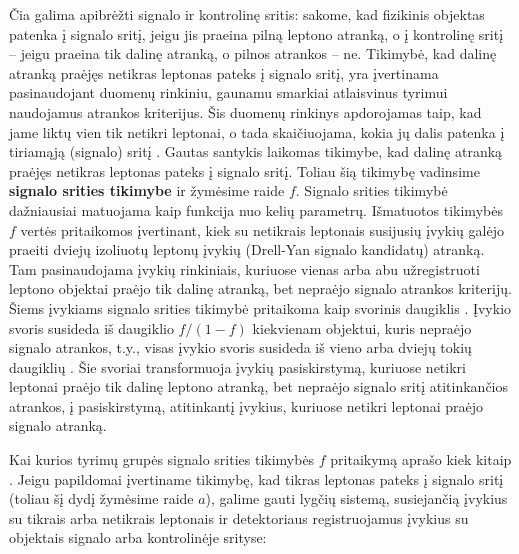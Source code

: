 \documentclass[a4paper, 12pt, oneside]{article}
\begin{document}
Čia galima apibrėžti signalo ir kontrolinę sritis: sakome, kad fizikinis objektas patenka į signalo sritį, jeigu jis
praeina pilną leptono atranką, o į kontrolinę sritį -- jeigu praeina tik dalinę atranką, o pilnos atrankos -- ne.
Tikimybė, kad dalinę atranką praėjęs netikras leptonas pateks į signalo sritį, yra įvertinama pasinaudojant duomenų
rinkiniu, gaunamu smarkiai atlaisvinus tyrimui naudojamus atrankos kriterijus.
Šis duomenų rinkinys apdorojamas taip, kad jame liktų vien tik netikri leptonai, o tada skaičiuojama, kokia jų
dalis patenka į tiriamąją (signalo) sritį \cite{DY_ATLAS2016, Z'_ATLAS2011, Z'_CMS2011, Z'_ATLAS2014, Z'_CMS2015}.
Gautas santykis laikomas tikimybe, kad dalinę atranką praėjęs netikras leptonas pateks į signalo sritį.
Toliau šią tikimybę vadinsime \textbf{signalo srities tikimybe} ir žymėsime raide $f$.
Signalo srities tikimybė dažniausiai matuojama kaip funkcija nuo kelių parametrų.
Išmatuotos tikimybės $f$ vertės pritaikomos įvertinant, kiek su netikrais leptonais susijusių įvykių galėjo praeiti dviejų
izoliuotų leptonų įvykių (Drell-Yan signalo kandidatų) atranką.
Tam pasinaudojama įvykių rinkiniais, kuriuose vienas arba abu užregistruoti leptono objektai praėjo tik dalinę atranką, bet
nepraėjo signalo atrankos kriterijų.
Šiems įvykiams signalo srities tikimybė pritaikoma kaip svorinis daugiklis \cite{Z'_ATLAS2011, Z'_CMS2011, Z'_CMS2015}.
Įvykio svoris susideda iš daugiklio $f/(1-f)$ kiekvienam objektui, kuris nepraėjo signalo atrankos, t.y., visas įvykio svoris
susideda iš vieno arba dviejų tokių daugiklių \cite{Z'_CMS2015}.
Šie svoriai transformuoja įvykių pasiskirstymą, kuriuose netikri leptonai praėjo tik dalinę leptono atranką,
bet nepraėjo signalo sritį atitinkančios atrankos, į pasiskirstymą, atitinkantį įvykius, kuriuose netikri leptonai
praėjo signalo atranką.

Kai kurios tyrimų grupės signalo srities tikimybės $f$ pritaikymą aprašo kiek kitaip \cite{DY_ATLAS2016, Z'_ATLAS2014}.
Jeigu papildomai įvertiname tikimybę, kad tikras leptonas pateks į signalo sritį (toliau šį dydį žymėsime raide $a$), galime
gauti lygčių sistemą, susiejančią įvykius su tikrais arba netikrais leptonais ir detektoriaus registruojamus įvykius su
objektais signalo arba kontrolinėje srityse:
\end{document}

